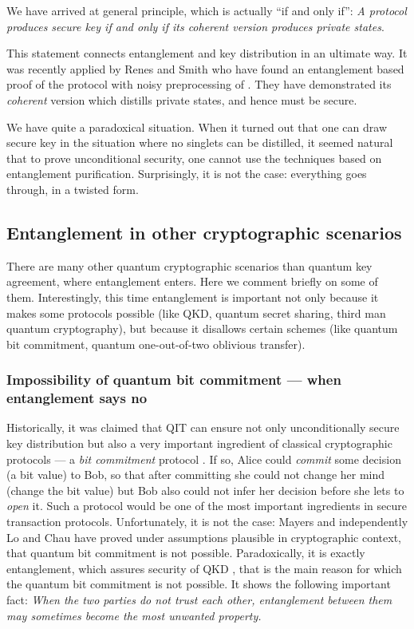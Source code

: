 \documentclass[twocolumn,aps,rmp]{revtex4}
\begin{document}
We have arrived at general principle,  which is actually ``if and only if'':
{\it A protocol produces secure key if and only if its coherent version produces
private states}.

This statement connects entanglement and key distribution in an
ultimate way. It was recently applied by Renes and Smith
\cite{RenesSmith06} who have found an entanglement based proof of the
\pmp protocol with noisy preprocessing of
\cite{RGKinfo_sec_proof_short,RGKinfo_sec_proof_long}. They have
demonstrated its {\it coherent} version which distills private states,
and hence must be secure.

We have quite a paradoxical situation. When it  turned out that one
can draw secure key in the situation where no singlets can be
distilled, it seemed natural that to prove unconditional security,
one cannot use the  techniques based on entanglement purification.
Surprisingly, it is not the case: everything goes through, in a
twisted form.



\subsection{Entanglement in other cryptographic scenarios}
There are many other quantum cryptographic scenarios than quantum key agreement, where entanglement enters. Here we comment briefly on some of them. Interestingly, this time entanglement is important not only because it makes some protocols possible (like QKD, quantum secret sharing, third man quantum cryptography), but because it disallows certain schemes (like quantum bit commitment, quantum one-out-of-two oblivious transfer).

\subsubsection{Impossibility of quantum bit commitment --- when entanglement says no}
Historically, it was claimed that QIT can ensure not only
unconditionally secure key distribution but also a very important
ingredient of classical cryptographic protocols --- a {\it bit
commitment} protocol \cite{Unsec_bitcom}. If so, Alice could {\it
commit} some decision (a bit value) to Bob, so that after committing
she could not change her mind (change the bit value) but Bob also
could not infer her decision before she lets to {\it open} it. Such
a protocol would be one of the most important ingredients in secure
transaction protocols. Unfortunately, it is not the case: Mayers
\cite{Mayers_nobitcom1,Mayers_nobitcom2} and independently Lo and
Chau \cite{LoChau_nobitcom1,LoChau_nobitcom2} have proved under
assumptions plausible in cryptographic context, that quantum bit
commitment is not possible. Paradoxically, it is exactly
entanglement, which assures security of QKD , that is the main
reason for which the quantum bit commitment is not possible. It
shows the following important fact: {\it When the two parties do not
trust each other, entanglement between them may sometimes become the
most unwanted property.}
\end{document}
